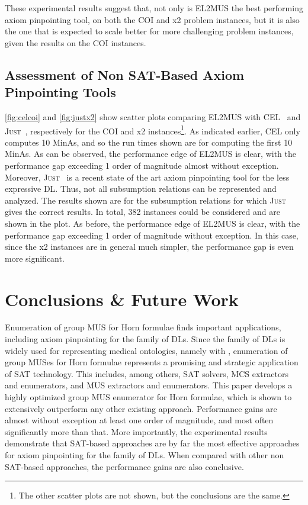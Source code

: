 \documentclass{llncs}
\newcommand{\elplus}{\xspace}
\newcommand{\elplain}{\xspace}
\newcommand{\just}{\textsc{Just}\xspace}
\begin{document}
These experimental results suggest that, not only is EL2MUS the best
performing axiom pinpointing tool, on both the COI and x2 problem
instances, but it is also the one that is expected to scale better for
more challenging problem instances, given the results on the COI
instances.


\subsection{Assessment of Non SAT-Based Axiom Pinpointing Tools}

\autoref{fig:celcoi} and \autoref{fig:justx2} show scatter plots comparing EL2MUS with
CEL~\cite{baader-ijcar06} and \just~\cite{ludwig-ore14}, respectively
for the COI and x2 instances\footnote{The other
  scatter plots are not shown, but the conclusions are the
  same.}.
As indicated earlier, CEL only computes 10 MinAs, and so the run times
shown are for computing the first 10 MinAs. As can be observed,
the performance edge of EL2MUS is clear, with the performance gap
exceeding 1 order of magnitude almost without exception.
Moreover, \just~\cite{ludwig-ore14} is a recent state of the art axiom
pinpointing tool for the less expressive  DL. Thus, not
all subsumption relations can be represented and analyzed. The results
shown are for the subsumption relations for which \just gives the
correct results. In total, 382 instances could be considered and are
shown in the plot. As before, the performance edge of EL2MUS is
clear, with the performance gap exceeding 1 order of magnitude without
exception. In this case, since  the x2 instances are in general much
simpler, the performance gap is even more significant.


\section{Conclusions \& Future Work} \label{sec:conc} 

Enumeration of group MUS for Horn formulae finds important
applications, including axiom pinpointing for the \elplain family of
DLs. Since the \elplain family of DLs is widely used for representing
medical ontologies, namely with \elplus, enumeration of group MUSes
for Horn formulae represents a promising and strategic application of
SAT technology. This includes, among others, SAT solvers, MCS extractors and enumerators, and MUS extractors and 
enumerators.
This paper develops a highly optimized group MUS enumerator for Horn
formulae, which is shown to extensively outperform any other existing
approach. Performance gains are almost without exception at least one
order of magnitude, and most often significantly more than that.
More importantly, the experimental results demonstrate that SAT-based
approaches are by far the most effective approaches for axiom
pinpointing for the \elplain family of DLs. When compared with other
non SAT-based approaches, the performance gains are also conclusive.
\end{document}
